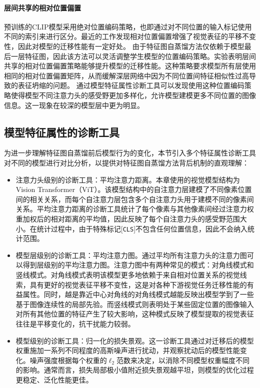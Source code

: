 \paragraph{层间共享的相对位置偏置} 预训练的CLIP模型采用绝对位置编码策略，也即通过对不同位置的输入标记使用不同的索引来进行区分。最近的工作\cite{Swin,li2022mvitv2}发现相对位置偏置增强了视觉表征的平移不变性，因此对模型的迁移性能有一定好处。
由于特征图自蒸馏方法仅依赖于模型最后一层特征图，因此该方法可以灵活调整学生模型的位置编码策略。实验表明层间共享的相对位置偏置策略\cite{bao2021beit}能够提升模型的迁移性能。这种策略要求模型所有层使用相同的相对位置偏置矩阵，从而缓解深层网络中因为不同位置间特征相似性过高导致的表征坍缩的问题\cite{xie2023revealing}。%
通过模型特征属性诊断工具可以发现使用这种位置编码策略使得模型不同注意力头的感受野更加多样化，允许模型建模更多不同位置的图像信息。这一现象在较深的模型层中更为明显。%

\subsection{模型特征属性的诊断工具}
为进一步理解特征图自蒸馏前后模型行为的变化，本节引入多个特征属性诊断工具对不同的模型进行对比分析，以提供对特征图自蒸馏方法背后机制的直观理解：
\begin{itemize}
    \item 注意力头级别的诊断工具：平均注意力距离\cite{dosovitskiy2020vit,xie2023revealing}。本章使用的视觉模型结构为Vision Transformer\cite{dosovitskiy2020vit}（ViT）。该模型结构中的自注意力层建模了不同像素位置间的相关关系，而每个自注意力层包含多个自注意力头用于建模不同的像素间关系。平均注意力距离的诊断工具统计了每个像素与其他像素间经过注意力权重加权后的相对距离的平均值，因此反映了每个自注意力头的感受野范围大小。在统计过程中，由于特殊标记[\texttt{CLS}]不包含任何位置信息，因此不会纳入统计范围。
    \item 模型层级别的诊断工具：平均注意力图\cite{zhou2021deepvit}。通过平均所有注意力头的注意力图可以得到层级别的平均注意力图。注意力图中有两种常见的模式：对角线模式和竖线模式。对角线模式表明该模型更多地依赖于来自相对位置关系的视觉线索，具有更好的视觉表征平移不变性，这是对各种下游视觉任务迁移性能的有益属性。同时，越是靠近中心对角线的对角线模式越能反映出模型学到了一些基于图像连续性的局部先验。而竖线模式则表明处于某些固定位置的图像输入对所有其他位置的特征产生了较大影响，这种模式反映了模型提取的视觉表征往往是平移变化的，抗干扰能力较弱。
    \item 模型级别的诊断工具：归一化的损失景观\cite{li2018visualizing}。这一诊断工具通过对迁移后的模型权重施加一系列不同程度的高斯噪声进行扰动，并观察扰动后的模型性能变化。噪声强度根据每个权重的$\ell_2$范数来决定，以消除不同模型权重幅度不同的影响。通常而言，损失局部极小值附近损失景观越平坦，则模型的优化过程更稳定、泛化性能更佳\cite{li2018visualizing}。
\end{itemize}

